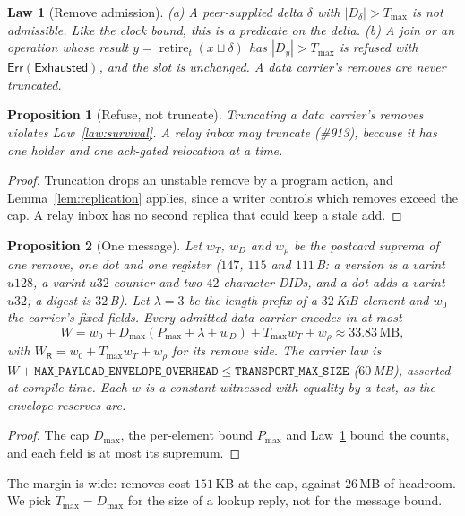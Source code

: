 \documentclass[journal]{IEEEtran}
\newtheorem{law}{Law}
\newtheorem{proposition}{Proposition}
\newcommand{\Err}{\mathsf{Err}}
\newcommand{\Exhausted}{\mathsf{Exhausted}}
\newcommand{\Rm}{\mathsf{R}}
\newcommand{\ret}{\operatorname{retire}}
\newcommand{\Tmax}{T_{\max}}
\newcommand{\Dmax}{D_{\max}}
\newcommand{\Pmax}{P_{\max}}
\newcommand{\issue}[1]{\#{#1}}
\begin{document}
\begin{law}[Remove admission]\label{law:admit}
(a) A peer-supplied delta $\delta$ with $|D_\delta|>\Tmax$ is not admissible.  Like the clock
bound, this is a predicate on the delta.
(b) A join or an operation whose result $y=\ret_t(x\sqcup\delta)$ has $|D_y|>\Tmax$ is refused
with $\Err(\Exhausted)$, and the slot is unchanged.
A data carrier's removes are never truncated.
\end{law}

\begin{proposition}[Refuse, not truncate]\label{prop:refuse}
Truncating a data carrier's removes violates Law~\ref{law:survival}.  A relay inbox may
truncate (\issue{913}), because it has one holder and one ack-gated relocation at a time.
\end{proposition}
\begin{proof}
Truncation drops an unstable remove by a program action, and Lemma~\ref{lem:replication}
applies, since a writer controls which removes exceed the cap.  A relay inbox has no second
replica that could keep a stale add.
\end{proof}

\begin{proposition}[One message]\label{prop:message}
Let $w_T$, $w_D$ and $w_\rho$ be the postcard suprema of one remove, one dot and one register
($147$, $115$ and $111$\,B: a version is a varint $u128$, a varint $u32$ counter and two
$42$-character DIDs, and a dot adds a varint
$u32$; a digest is $32$\,B).  Let $\lambda=3$ be the length prefix of a $32$\,KiB element and
$w_0$ the carrier's fixed fields.  Every admitted data carrier encodes in at most
\[
W=w_0+\Dmax(\Pmax+\lambda+w_D)+\Tmax w_T+w_\rho\approx33.83\,\text{MB},
\]
with $W_\Rm=w_0+\Tmax w_T+w_\rho$ for its remove side.  The carrier law is
$W+\mathtt{MAX\_PAYLOAD\_ENVELOPE\_OVERHEAD}\le\mathtt{TRANSPORT\_MAX\_SIZE}$
($60$\,MB), asserted at compile time.  Each $w$ is a constant witnessed with equality by a
test, as the envelope reserves are.
\end{proposition}
\begin{proof}
The cap $\Dmax$, the per-element bound $\Pmax$ and Law~\ref{law:admit} bound the counts, and
each field is at most its supremum.
\end{proof}

The margin is wide: removes cost $151$\,KB at the cap, against $26$\,MB of headroom.  We pick
$\Tmax=\Dmax$ for the size of a lookup reply, not for the message bound.
\end{document}
